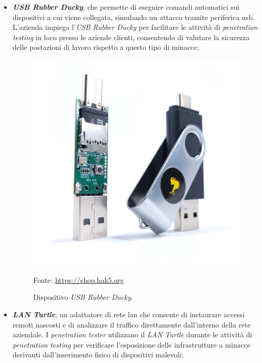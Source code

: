 \begin{itemize}
    \item \textbf{\textit{USB Rubber Ducky}}, che permette di eseguire comandi automatici sui dispositivi a cui viene collegata, simulando un attacco tramite periferica \gls{usb}. L'azienda impiega l'\textit{USB Rubber Ducky} per facilitare le attività di \textit{penetration testing} in loco presso le aziende clienti, consentendo di valutare la sicurezza delle postazioni di lavoro rispetto a questo tipo di minacce;\\
    \begin{figure}[H]
    \centering
    \includegraphics[alt={USB Rubber Ducky}, width=0.8\columnwidth]{img/usb-rubber-ducky_mk2_2000x.jpg}
    \caption{Dispositivo \textit{USB Rubber Ducky}.}
    Fonte: \url{https://shop.hak5.org}
    \label{fig:usb-rubber-ducky}
    \end{figure}
    \item \textbf{\textit{LAN Turtle}}, un adattatore di rete \gls{lan} che consente di instaurare accessi remoti nascosti e di analizzare il traffico direttamente dall'interno della rete aziendale. I \textit{penetration tester} utilizzano il \textit{LAN Turtle} durante le attività di \textit{penetration testing} per verificare l'esposizione delle infrastrutture a minacce derivanti dall'inserimento fisico di dispositivi malevoli;
    \begin{figure}[H]
    \centering

\end{figure}
\end{itemize}
